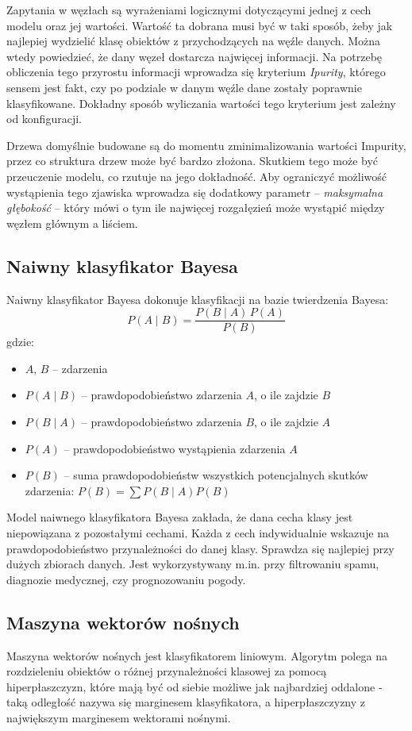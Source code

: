 \documentclass[a4paper,11pt]{article}
\begin{document}
Zapytania w węzłach są wyrażeniami logicznymi dotyczącymi jednej z cech modelu oraz jej wartości. Wartość ta dobrana musi być w taki sposób, żeby jak najlepiej wydzielić klasę obiektów z przychodzących na węźle danych. Można wtedy powiedzieć, że dany węzeł dostarcza najwięcej informacji. Na potrzebę obliczenia tego przyrostu informacji wprowadza się kryterium \textit{Ipurity}, którego sensem jest fakt, czy po podziale w danym węźle dane zostały poprawnie klasyfikowane. Dokładny sposób wyliczania wartości tego kryterium jest zależny od konfiguracji.
\par
Drzewa domyślnie budowane są do momentu zminimalizowania wartości Impurity, przez co struktura drzew może być bardzo złożona. Skutkiem tego może być przeuczenie modelu, co rzutuje na jego dokładność. Aby ograniczyć możliwość wystąpienia tego zjawiska wprowadza się dodatkowy parametr --  \textit{maksymalna głębokość} -- który mówi o tym ile najwięcej rozgałęzień może wystąpić między węzłem głównym a liściem.

\subsection{Naiwny klasyfikator Bayesa}
Naiwny klasyfikator Bayesa dokonuje klasyfikacji na bazie twierdzenia Bayesa:
$$ P(A \mid B) = \frac{P(B \mid A) \, P(A)}{P(B)} $$
gdzie:
\begin{itemize}
    \item $A$, $B$ -- zdarzenia
    \item $P(A \mid B)$ -- prawdopodobieństwo zdarzenia $A$, o ile zajdzie $B$
    \item $P(B \mid A)$ -- prawdopodobieństwo zdarzenia $B$, o ile zajdzie $A$
    \item $P(A)$ -- prawdopodobieństwo wystąpienia zdarzenia $A$
    \item $P(B)$ -- suma prawdopodobieństw wszystkich potencjalnych skutków zdarzenia: $P(B)=\sum P(B\mid A)P(B)$
\end{itemize}

Model naiwnego klasyfikatora Bayesa zakłada, że dana cecha klasy jest niepowiązana z pozostałymi cechami. Każda z cech indywidualnie wskazuje na prawdopodobieństwo przynależności do danej klasy.
Sprawdza się najlepiej przy dużych zbiorach danych. Jest wykorzystywany m.in. przy filtrowaniu spamu, diagnozie medycznej, czy prognozowaniu pogody.

\subsection{Maszyna wektorów nośnych}
Maszyna wektorów nośnych jest klasyfikatorem liniowym. Algorytm polega na rozdzieleniu obiektów o różnej przynależności klasowej za pomocą hiperpłaszczyzn, które mają być od siebie możliwe jak najbardziej oddalone - taką odległość nazywa się marginesem klasyfikatora, a hiperpłaszczyzny z największym marginesem wektorami nośnymi. 
\end{document}
